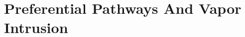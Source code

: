 \documentclass[../thesis.tex]{subfiles}
\begin{document}
\chapter{Preferential Pathways And Vapor Intrusion}

\begin{abstract}

\end{abstract}





\begin{comment}

Main point of this chapter:

Demonstrate how and why subsurface preferential pathways can have such a significant effect on VI.

Outline:

Introduction:
* How did we come to find out about PP?
* Why should we care about them?
* How do they work?

Methods:
* How do we model the PP?

Results & Discussion:

* Show how the model predicts the VI at the ASU house. (Main case)
* Turn on and off the enhanced advective potential and contaminant availability to show their contributions.
* Some other factors that affect PP "performance" in the main case. I.e. effect of gravel sub-base.


Conclusion:
* PPs need to enhance advective transport and introduce extra contaminants to be impactful (plus other factors). How common place these combination of factors are determine the concern for PPs.
* Suggestions for how to deal/uncover PPs? Follow Danish recommendations. See if subsurface piping may be discovered a priori. Sample nearby manholes (likely to play some role). Might even use CPM.

\end{comment}
\end{document}

